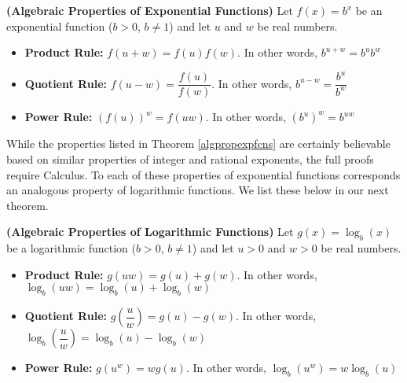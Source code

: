 \colorbox{ResultColor}{\bbm

\begin{thm}  \label{algpropexpfcns} \textbf{(Algebraic Properties of Exponential Functions)}  Let $f(x) = b^{x}$ be an exponential function ($b > 0$, $b\neq 1$) and let $u$ and $w$ be real numbers. 

\begin{itemize}

\item  \textbf{Product Rule:}  $f(u+w) = f(u) f(w)$.  In other words, $b^{u+w} = b^{u} b^{w}$

\item  \textbf{Quotient Rule:}  $f(u-w) = \dfrac{f(u)}{f(w)}$.  In other words, $b^{u-w} = \dfrac{b^{u}}{b^{w}}$

\item  \textbf{Power Rule:}  $\left(f(u)\right)^w = f(uw)$.  In other words, $\left(b^{u}\right)^{w} = b^{uw}$

\end{itemize}

\end{thm}

\ebm}

\smallskip

While the properties listed in Theorem \ref{algpropexpfcns} are certainly believable based on similar properties of integer and rational exponents, the full proofs require Calculus.  To each of these properties of exponential functions corresponds an analogous property of logarithmic functions.  We list these below in our next theorem.

\smallskip

\colorbox{ResultColor}{\bbm

\begin{thm}  \label{algproplogfcns} \textbf{(Algebraic Properties of Logarithmic Functions)}  Let $g(x) =\log_{b}(x)$ be a logarithmic function ($b > 0$, $b\neq 1$) and let $u>0$ and $w>0$ be real numbers. 

\begin{itemize}

\item  \textbf{Product Rule:}  $g(uw) = g(u)+ g(w)$.  In other words, $\log_{b}(uw) = \log_{b}(u) + \log_{b}(w)$

\item  \textbf{Quotient Rule:}  $g\left(\dfrac{u}{w} \right) = g(u) - g(w)$.  In other words, $\log_{b} \left( \dfrac{u}{w} \right) = \log_{b}(u) - \log_{b}(w)$

\item  \textbf{Power Rule:}  $g\left(u^{w}\right) =w g(u)$.  In other words, $\log_{b}\left(u^{w}\right) = w \log_{b}(u)$

\end{itemize}

\end{thm}

\ebm}

